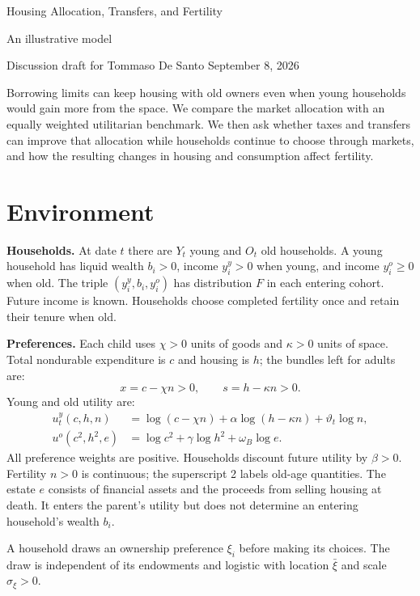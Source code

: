 \documentclass[11pt]{article}
\begin{document}
\begin{center}
{\Large Housing Allocation, Transfers, and Fertility}\par
\smallskip
{\large An illustrative model}\par
\smallskip
{\small Discussion draft for Tommaso De Santo \quad September 8, 2026}
\end{center}
\medskip

Borrowing limits can keep housing with old owners even when young households
would gain more from the space. We compare the market allocation with an
equally weighted utilitarian benchmark. We then ask whether taxes and transfers
can improve that allocation while households continue to choose through markets,
and how the resulting changes in housing and consumption affect fertility.

\section{Environment}

\textbf{Households.} At date $t$ there are $Y_t$ young and $O_t$ old households.
A young household has liquid wealth $b_i>0$, income $y_i^y>0$ when young, and
income $y_i^o\ge0$ when old. The triple $(y_i^y,b_i,y_i^o)$ has distribution $F$
in each entering cohort. Future income is known. Households choose completed
fertility once and retain their tenure when old.

\textbf{Preferences.} Each child uses $\chi>0$ units of goods and $\kappa>0$
units of space. Total nondurable expenditure is $c$ and housing is $h$; the
bundles left for adults are:
\begin{equation}
x=c-\chi n>0,\qquad s=h-\kappa n>0.
\end{equation}
Young and old utility are:
\begin{align}
u_t^y(c,h,n)&=\log(c-\chi n)+\alpha\log(h-\kappa n)+\vartheta_t\log n,
\label{eq:new_uy}\\
u^o(c^2,h^2,e)&=\log c^2+\gamma\log h^2+\omega_B\log e.
\label{eq:new_uo}
\end{align}
All preference weights are positive. Households discount future utility by
$\beta>0$. Fertility $n>0$ is continuous; the superscript 2 labels old-age
quantities. The estate $e$ consists of financial assets and the proceeds from
selling housing at death. It enters the parent's utility but does not determine
an entering household's wealth $b_i$.

A household draws an ownership preference $\xi_i$ before making its choices.
The draw is independent of its endowments and logistic with location $\bar\xi$
and scale $\sigma_\xi>0$.
\end{document}
